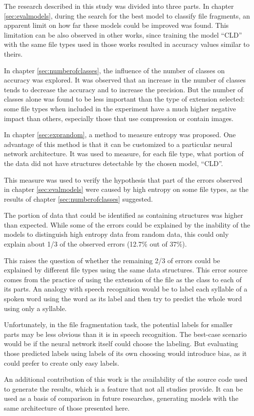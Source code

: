 The research described in this study was divided into three parts.
In chapter \ref{sec:evalmodels}, during the search for the best model to classify file fragments, an apparent limit on how far these models could be improved was found. This limitation can be also observed in other works, since training the model ``CLD'' with the same file types used in those works resulted in accuracy values similar to theirs.

In chapter \ref{sec:numberofclasses}, the influence of the number of classes on accuracy was explored. It was observed that an increase in the number of classes tends to decrease the accuracy and to increase the precision. But the number of classes alone was found to be less important than the type of extension selected: some file types when included in the experiment have a much higher negative impact than others, especially those that use compression or contain images.

In chapter \ref{sec:exprandom}, a method to measure entropy was proposed. One advantage of this method is that it can be customized to a particular neural network architecture. It was used to measure, for each file type, what portion of the data did not have structures detectable by the chosen model, ``CLD''.

This measure was used to verify the hypothesis that part of the errors observed in chapter \ref{sec:evalmodels} were caused by high entropy on some file types, as the results of chapter  \ref{sec:numberofclasses} suggested.

The portion of data that could be identified as containing structures was higher than expected. While some of the errors could be explained by the inability of the models to distinguish  high entropy data from random data, this could only explain about 1/3 of the observed errors (12.7\% out of 37\%).

This raises the question of whether the remaining 2/3 of errors could be explained by different file types using the same data structures. This error source comes from the practice of using the extension of the file as the class to each of its parts. An analogy with speech recognition would be to label each syllable of a spoken word using the word as its label and then try to predict the whole word using only a syllable.

Unfortunately, in the file fragmentation task, the potential labels for smaller parts may be less obvious than it is in speech recognition. The best-case scenario would be if the neural network itself could choose the labeling. But evaluating those predicted labels using labels of its own choosing would introduce bias, as it could prefer to create only easy labels.

An additional contribution of this work is the availability of the source code used to generate the results, which is a feature that not all studies provide. It can be used as a basis of comparison in future researches, generating models with the same architecture of those presented here.